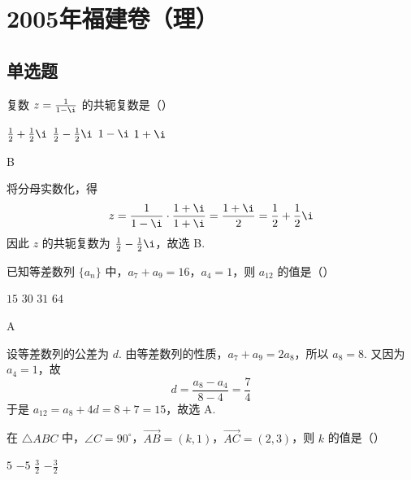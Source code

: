 \chapter{2005年福建卷（理）}

\section{单选题}

\begin{problem}
复数 \(z = \frac{1}{1 - \i}\) 的共轭复数是（\quad）

\choices
    {\(\frac{1}{2} + \frac{1}{2}\i\)}
    {\(\frac{1}{2} - \frac{1}{2}\i\)}
    {\(1 - \i\)}
    {\(1 + \i\)}
\end{problem}

\begin{answer}
B
\end{answer}

\begin{solution}
将分母实数化，得
\[
z=\frac{1}{1-\i}\cdot\frac{1+\i}{1+\i}=\frac{1+\i}{2}=\frac{1}{2}+\frac{1}{2}\i
\]
因此 \(z\) 的共轭复数为 \(\frac{1}{2}-\frac{1}{2}\i\)，故选 B.
\end{solution}



\begin{problem}
已知等差数列 \(\{a_n\}\) 中，\(a_7 + a_9 = 16\)，\(a_4 = 1\)，则 \(a_{12}\) 的值是（\quad）

\choices
    {\(15\)}
    {\(30\)}
    {\(31\)}
    {\(64\)}
\end{problem}

\begin{answer}
A
\end{answer}

\begin{solution}
设等差数列的公差为 \(d\). 由等差数列的性质，\(a_7+a_9=2a_8\)，所以 \(a_8=8\). 又因为 \(a_4=1\)，故
\[
d=\frac{a_8-a_4}{8-4}=\frac{7}{4}
\]
于是 \(a_{12}=a_8+4d=8+7=15\)，故选 A.
\end{solution}



\begin{problem}
在 \(\triangle ABC\) 中，\(\angle C = 90^{\circ}\)，\(\overrightarrow{AB} = (k, 1)\)，\(\overrightarrow{AC} = (2, 3)\)，则 \(k\) 的值是（\quad）

\choices
    {\(5\)}
    {\(-5\)}
    {\(\frac{3}{2}\)}
    {\(-\frac{3}{2}\)}
\end{problem}

